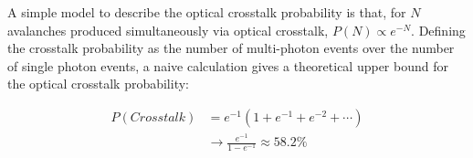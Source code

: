 A simple model to describe the optical crosstalk probability is that, for $N$ avalanches produced simultaneously via optical crosstalk, $P(N) \propto e^{-N}$. \cite{acerbi2019} Defining the crosstalk probability as the number of multi-photon events over the number of single photon events, a naive calculation gives a theoretical upper bound for the optical crosstalk probability:

\begin{align*}
  P(Crosstalk) &= e^{-1}(1+e^{-1}+e^{-2}+\cdots) \\
  &\to \frac{e^{-1}}{1-e^{-1}} \approx 58.2\%
\end{align*}
